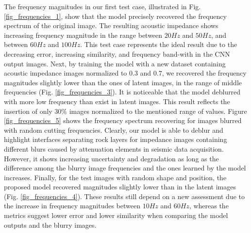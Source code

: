 \documentclass[conference]{IEEEtran}
\begin{document}
The frequency magnitudes in our first test case, illustrated in Fig. \ref{fig_frequencies_1},
show that the model precisely recovered the frequency spectrum of the original image.
The resulting acoustic impedance shows increasing frequency magnitude in the range
between $ 20Hz$ and $ 50Hz $, and between $ 60Hz $ and $ 100Hz $.
This test case represents the ideal result due to the
decreasing error, increasing similarity, and frequency band-with in the CNN output images.
Next, by training the model with a new dataset containing acoustic impedance images normalized to $0.3$ and $0.7$, we recovered the frequency magnitudes slightly lower than the ones of latent images, in the range of middle frequencies
(Fig. \ref{fig_frequencies_3}). It is noticeable that the model deblurred with
more low frequency than exist in latent images. This result reflects the insertion of only $30\%$ images normalized to the mentioned range
of values.
Figure \ref{fig_frequencies_5} shows the frequency spectrum recovering for images blurred with random cutting
frequencies. Clearly, our model is able to deblur and highlight interfaces separating rock layers for impedance images containing different blurs caused by attenuation elements in seismic data acquisition. However, it shows increasing uncertainty and degradation as long as the difference among the blurry image frequencies and the ones learned by the model increases.
Finally, for the test images with random shape and position, the proposed model recovered magnitudes slightly lower than in the latent images (Fig. \ref{fig_frequencies_4}). These results still depend on a new assessment due to the increase in frequency magnitudes between $10Hz$ and $60Hz$,  whereas the metrics suggest lower error and lower similarity when comparing the model outputs and the blurry images.
\end{document}
